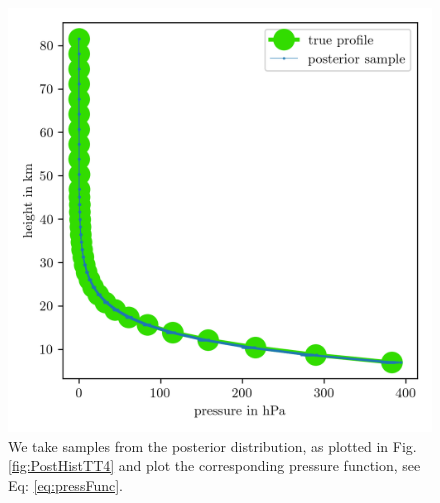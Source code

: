 \begin{figure}[ht!]
	\centering
	\includegraphics{PressPostMeanSigm.png}
	\caption[Pressure posterior samples.]{We take samples from the posterior distribution, as plotted in Fig. \ref{fig:PostHistTT4} and plot the corresponding pressure function, see Eq: \ref{eq:pressFunc}.}
	\label{fig:PressPost}
\end{figure}

